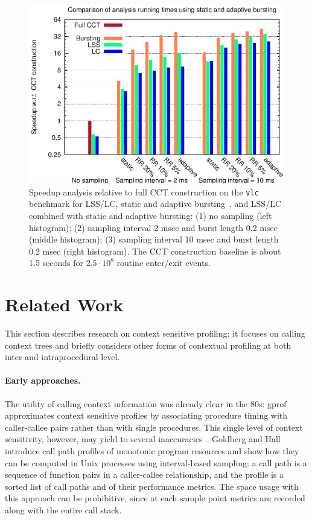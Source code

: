 \documentclass{sigplanconf}
\begin{document}
\begin{figure}[t]
\center\includegraphics[width=\columnwidth]{charts/speedup.eps}
\caption{Speedup analysis relative to full CCT construction on the {\tt vlc} benchmark for LSS/LC, static and adaptive bursting~\cite{ZSCC06}, and LSS/LC combined with static and adaptive bursting: (1) no sampling (left histogram); (2) sampling interval 2 msec and burst length 0.2 msec (middle histogram); (3) sampling interval 10 msec and burst length 0.2 msec (right histogram). The CCT construction baseline is about 1.5 seconds for $2.5\cdot 10^8$ routine enter/exit events. }
\label{fig:speedup}
\end{figure} 


\section{Related Work}
\label{se:related}

This section describes research on context sensitive profiling: it focuses on calling context trees and briefly considers other forms of contextual profiling at both inter and intraprocedural level.

\paragraph{Early approaches.} The utility of calling context information was already clear in the 80s: gprof~\cite{GKM82} approximates context sensitive profiles by associating procedure timing with caller-callee pairs rather than with single procedures. This single level of context sensitivity, however, may yield to several inaccuracies~\cite{PF88, S04}. Goldberg and Hall~\cite{HG93}  introduce call path profiles of monotonic program resources and show how they can be computed in Unix processes using interval-based sampling: a call path is a sequence of function pairs in a caller-callee relationship, and the profile is a sorted list of call paths and of their performance metrics. The space usage with this approach can be prohibitive, since at each sample point metrics are recorded along with the entire call stack.
\end{document}
